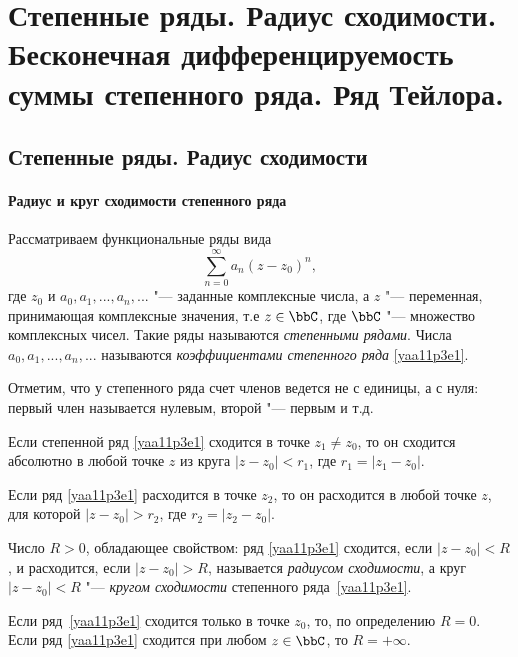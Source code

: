 \chapter{Степенные ряды. Радиус сходимости. Бесконечная дифференцируемость суммы степенного ряда. Ряд Тейлора.}
\section{Степенные ряды. Радиус сходимости}
\subsubsection{Радиус и круг сходимости степенного ряда}
Рассматриваем функциональные ряды вида
\begin{equation}\label{yaa11p3e1}
\sum\limits_{n=0}^{\infty} a_n(z-z_0)^n,
\end{equation}
где $z_0$ и $a_0,a_1,...,a_n,...$ "--- заданные комплексные числа, а $z$ "--- переменная, принимающая комплексные значения, т.е $z\in\bbC$, где $\bbC$ "--- множество комплексных чисел. Такие ряды называются \textit{степенными рядами}. Числа $a_0,a_1,...,a_n,...$ называются \textit{коэффициентами степенного ряда} \eqref{yaa11p3e1}.

Отметим, что у степенного ряда счет членов ведется не с единицы, а с нуля: первый член называется нулевым, второй "--- первым и т.д.

\begin{thm} \label{yaa11p3thm1}
Если степенной ряд \eqref{yaa11p3e1} сходится в точке $z_1\ne z_0$, то он сходится абсолютно в любой точке $z$ из круга $|z-z_0|<r_1$, где $r_1=|z_1-z_0|$.
\end{thm}

\begin{cons}
Если ряд \eqref{yaa11p3e1} расходится в точке $z_2$, то он расходится в любой точке $z$, для которой $|z-z_0|>r_2$, где $r_2=|z_2-z_0|$.
\end{cons}

\begin{defn}
Число $R>0$, обладающее свойством: ряд \eqref{yaa11p3e1} сходится, если $|z-z_0|<R$, и расходится, если $|z-z_0|>R$, называется \textit{радиусом сходимости}, а круг $|z-z_0|<R$ "--- \textit{кругом сходимости} степенного ряда~\eqref{yaa11p3e1}.

Если ряд~\eqref{yaa11p3e1} сходится только в точке $z_0$, то, по определению $R=0$. Если ряд \eqref{yaa11p3e1} сходится при любом $z\in\bbC$, то $R=+\infty$.
\end{defn}

